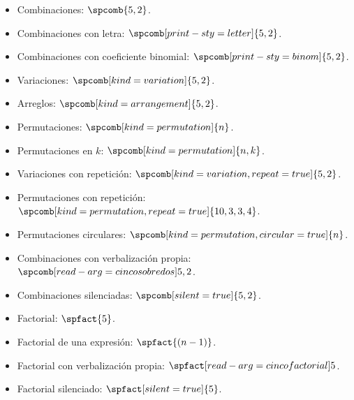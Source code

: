 \documentclass{article}
\begin{document}
\begin{itemize}
  \item Combinaciones: $\spcomb{5,2}$.
  \item Combinaciones con letra: $\spcomb[print-sty=letter]{5,2}$.
  \item Combinaciones con coeficiente binomial: $\spcomb[print-sty=binom]{5,2}$.
  \item Variaciones: $\spcomb[kind=variation]{5,2}$.
  \item Arreglos: $\spcomb[kind=arrangement]{5,2}$.
  \item Permutaciones: $\spcomb[kind=permutation]{n}$.
  \item Permutaciones en $k$: $\spcomb[kind=permutation]{n,k}$.
  \item Variaciones con repetición: $\spcomb[kind=variation,repeat=true]{5,2}$.
  \item Permutaciones con repetición: $\spcomb[kind=permutation,repeat=true]{10,3,3,4}$.
  \item Permutaciones circulares: $\spcomb[kind=permutation,circular=true]{n}$.
  \item Combinaciones con verbalización propia: $\spcomb[read-arg={cinco sobre dos}]{5,2}$.
  \item Combinaciones silenciadas: $\spcomb[silent=true]{5,2}$.
  \item Factorial: $\spfact{5}$.
  \item Factorial de una expresión: $\spfact{(n-1)}$.
  \item Factorial con verbalización propia: $\spfact[read-arg={cinco factorial}]{5}$.
  \item Factorial silenciado: $\spfact[silent=true]{5}$.
\end{itemize}
\end{document}
